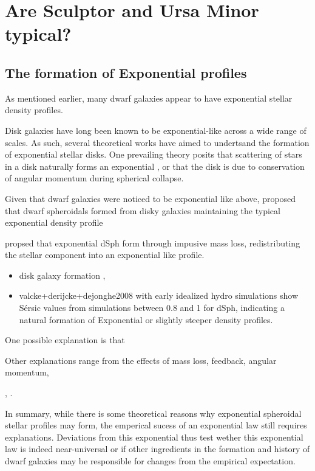 \section{Are Sculptor and Ursa Minor
typical?}\label{are-sculptor-and-ursa-minor-typical}

\subsection{The formation of Exponential
profiles}\label{the-formation-of-exponential-profiles}

As mentioned earlier, many dwarf galaxies appear to have exponential
stellar density profiles.

Disk galaxies have long been known to be exponential-like across a wide
range of scales. As such, several theoretical works have aimed to
undertsand the formation of exponential stellar disks. One prevailing
theory posits that scattering of stars in a disk naturally forms an
exponential \citep[\citet{wu+2022}]{elmegreen+struck2013}, or that the
disk is due to conservation of angular momentum during spherical
collapse.

Given that dwarf galaxies were noticed to be exponential like above,
\citet{faber+lin1983} proposed that dwarf spheroidals formed from disky
galaxies maintaining the typical exponential density profile

\citet{reed+gilmore2005} propsed that exponential dSph form through
impusive mass loss, redistributing the stellar component into an
exponential like profile.

\begin{itemize}
\tightlist
\item
  disk galaxy formation \citet{fall+efstathiou1980}, \citet{mestel1963}
\item
  valcke+derijcke+dejonghe2008 with early idealized hydro simulations
  show Sérsic values from simulations between 0.8 and 1 for dSph,
  indicating a natural formation of Exponential or slightly steeper
  density profiles.
\end{itemize}

One possible explanation is that \citet{mayer+2001a}

Other explanations range from the effects of mass loss, feedback,
angular momentum,

\citet{klimentowski2007}, \citet{klimentowski2009}.

In summary, while there is some theoretical reasons why exponential
spheroidal stellar profiles may form, the emperical sucess of an
exponential law still requires explanations. Deviations from this
exponential thus test wether this exponential law is indeed
near-universal or if other ingredients in the formation and history of
dwarf galaxies may be responsible for changes from the empirical
expectation.

